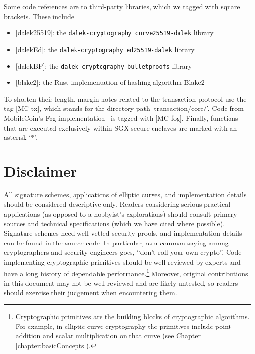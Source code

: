 Some code references are to third-party libraries, which we tagged with square brackets. These include
\begin{itemize}
    \item {[dalek25519]}: the {\tt dalek-cryptography curve25519-dalek} library \cite{dalek-curve25519-lib}
    \item {[dalekEd]}: the {\tt dalek-cryptography ed25519-dalek} library \cite{dalek-ed25519-lib}
    \item {[dalekBP]}: the {\tt dalek-cryptography bulletproofs} library \cite{dalek-bulletproofs-lib}
    \item {[blake2]}: the Rust implementation \cite{blake2-rust-lib} of hashing algorithm Blake2 \cite{blake-hashing-algorithm}
\end{itemize}

To shorten their length, margin notes related to the transaction protocol use the tag [MC-tx], which stands for the directory path `transaction/core/'. Code from MobileCoin's Fog implementation~\cite{mobilecoin-fog-source-code} is tagged with [MC-fog]. Finally, functions that are executed exclusively within SGX secure enclaves are marked with an asterisk `*'.



\section{Disclaimer}

All signature schemes, applications of elliptic curves, and implementation details should be considered descriptive only. Readers considering serious practical applications (as opposed to a hobbyist's explorations) should consult primary sources and technical specifications (which we have cited where possible). Signature schemes need well-vetted security proofs, and implementation details can be found in the source code. In particular, as a common saying among cryptographers and security engineers goes, ``don't roll your own crypto''. Code implementing cryptographic primitives should be well-reviewed by experts and have a long history of dependable performance.\footnote{Cryptographic primitives are the building blocks of cryptographic algorithms. For example, in elliptic curve cryptography the primitives include point addition and scalar multiplication on that curve (see Chapter \ref{chapter:basicConcepts}).} Moreover, original contributions in this document may not be well-reviewed and are likely untested, so readers should exercise their judgement when encountering them.



